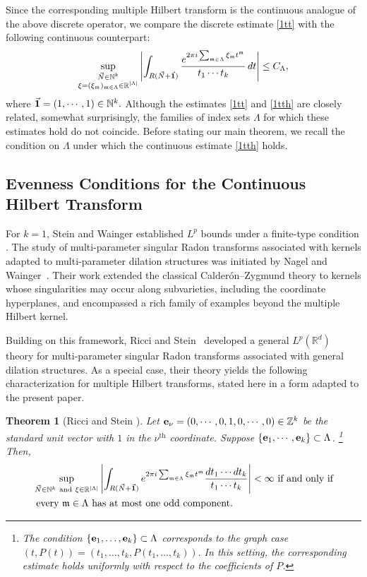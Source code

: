 \documentclass[11 pt,letterpaper]{amsart}
\theoremstyle{plain}
\newtheorem{theorem}{Theorem}\numberwithin{theorem}{section}
\theoremstyle{definition}
\theoremstyle{remark} \theoremstyle{exam} \theoremstyle{ob}
\numberwithin{equation}{section}
\begin{document}
Since the corresponding multiple Hilbert transform is the continuous
analogue of the above discrete operator, we compare the discrete estimate \eqref{1tt} with the following continuous counterpart:
\begin{align}\label{1tth}
	\sup_{\substack{
			\vec N\in\mathbb N^k\\
			\xi=(\xi_{\mathfrak m})_{\mathfrak m\in\Lambda}\in\mathbb R^{|\Lambda|}
	}}
	\left|
	\int_{R(\vec N+\vec{\bf{1}}) }
	\frac{e^{2\pi i\sum_{\mathfrak m\in\Lambda}
			\xi_{\mathfrak m}t^{\mathfrak m}}}{t_1\cdots t_k}\,
	dt
	\right|
	\le C_\Lambda,
\end{align}where $\vec{\bf{1}}=(1,\cdots,1)\in \mathbb{N}^{k}.$
Although the estimates \eqref{1tt} and \eqref{1tth} are closely related,
somewhat surprisingly, the families of index sets $\Lambda$ for which these estimates hold
do not coincide.
Before stating our main theorem, we recall the condition on $\Lambda$
under which the continuous estimate \eqref{1tth} holds.  

\subsection{Evenness Conditions for the Continuous Hilbert Transform}
For $k=1$, Stein and Wainger established $L^p$ bounds under a finite-type
condition \cite{SW1}.
The study of multi-parameter singular Radon transforms associated with
kernels adapted to multi-parameter dilation structures was initiated by
Nagel and Wainger~\cite{NW}. Their work extended the classical
Calderón--Zygmund theory to kernels whose singularities may occur along
subvarieties, including the coordinate hyperplanes, and encompassed a rich
family of examples beyond the multiple Hilbert kernel.

Building on this framework, Ricci and Stein~\cite{RS1} developed a general
$L^p(\mathbb R^d)$ theory for multi-parameter singular Radon transforms
associated with general dilation structures. As a special case, their
theory yields the following characterization for multiple Hilbert
transforms, stated here in a form adapted to the present paper.
\begin{theorem}[Ricci and Stein \cite{RS1}]\label{cho4}
	Let  ${\bf e}_\nu = (0, \cdots, 0, 1, 0, \cdots, 0) \in \mathbb{Z}^k$ be the standard unit vector with $1$ in the $\nu^{\text{th}}$ coordinate.  Suppose  $\{{\bf e}_1,\cdots,{\bf e}_k\}\subset \Lambda$. \footnote{The condition
		$\{{\bf e}_1,\ldots,{\bf e}_k\}\subset\Lambda$
		corresponds to the graph case
		$
		(t,P(t))=(t_1,\ldots,t_k,P(t_1,\ldots,t_k)).
		$
		In this setting, the corresponding estimate holds uniformly with respect to the coefficients of $P$.}
	Then,
	\begin{align*} 
		& \sup_{\vec{N}\in \mathbb{N}^k \   \text{and}\  \xi\in\mathbb{R}^{|\Lambda|}  }\left|\int_{  R(\vec{N}+\vec{\bf{1}})}e^{2\pi i \sum_{\mathfrak{m}\in\Lambda  } \xi_{\mathfrak{m}}t^\mathfrak{m}} \frac{ dt_1\cdots dt_k}{t_1\cdots t_k}\right|<\infty\ \text{if and only if}\nonumber\\
		& \text{ every $\mathfrak{m} \in \Lambda$ has at most one odd component.  }
	\end{align*}
\end{theorem}
\end{document}
